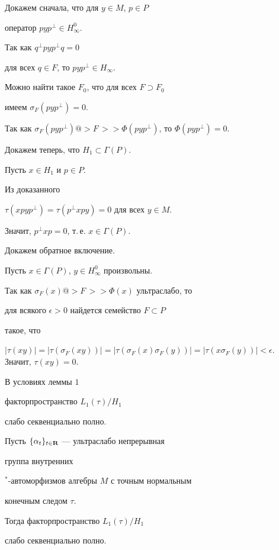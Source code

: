 Докажем сначала, что для $y\in M$, $p\in P$ 


оператор $pyp^{\perp}\in H_{\infty}^{0}$.


Так как $q^{\perp}pyp^{\perp}q=0$


для всех $q\in F$, то $pyp^{\perp}\in H_{\infty}$.


Можно найти такое $F_{0}$, что для всех $F\supset F_{0}$


имеем $\sigma_{F}(pyp^{\perp})=0$.


Так как $\sigma_{F}(pyp^{\perp}) @>{F\,}>>


\Phi(pyp^{\perp})$, то $\Phi(pyp^{\perp})=0$.


Докажем теперь, что $H_{1}\subset \Gamma(P)$.


Пусть $x\in H_{1}$ и $p\in P$.


Из доказанного


$\tau(xpyp^{\perp})=\tau(p^{\perp}xpy)=0$ для всех $y\in M$.


Значит, $p^{\perp}xp=0$, т.\,е. $x\in {\Gamma}(P)$.


Докажем обратное включение.


Пусть $x\in \Gamma(P)$, $y\in H_{\infty}^{0}$ произвольны.


Так как $\sigma_F(x) @>{F\,}>>


\Phi(x)$ ультраслабо, то


для всякого $\epsilon >0$ найдется семейство $F\subset P$


такое, что


$|\tau(xy)|=|\tau(\sigma_F(xy))|


=|\tau(\sigma_F(x)\sigma_F(y))|


=|\tau(x\sigma_F(y))|<\epsilon$. Значит, $\tau(xy)=0$.





\begin{thm}


В условиях леммы $1$


факторпространство $L_{1}(\tau)/H_{1}$


слабо секвенциально полно.


\end{thm}








\begin{thm}


Пусть $\{\alpha_{t}\}_{t\in {\bold R}}$ --- ультраслабо непрерывная 


группа внутренних


$^{*}$-авто\-мор\-физ\-мов алгебры $M$ с точным нормальным


конечным следом $\tau$.


Тогда факторпространство $L_{1}({\tau})/H_{1}$


слабо секвенциально полно.


\end{thm}





